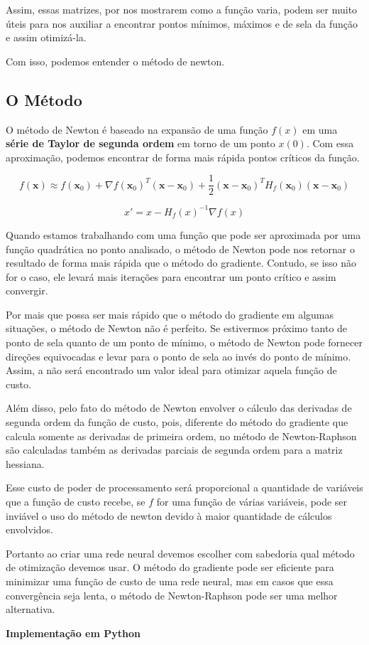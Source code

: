 Assim, essas matrizes, por nos mostrarem como a função varia, podem ser muito úteis para nos auxiliar a encontrar pontos mínimos, máximos e de sela da função e assim otimizá-la.

Com isso, podemos entender o método de newton.

\subsection{O Método}

O método de Newton é baseado na expansão de uma função $f(x)$ em uma \textbf{série de Taylor de segunda ordem} em torno de um ponto $x(0)$. Com essa aproximação, podemos encontrar de forma mais rápida pontos críticos da função.

    \begin{equation}
         f(\mathbf{x}) \approx f(\mathbf{x}_0) + \nabla f(\mathbf{x}_0)^T (\mathbf{x} - \mathbf{x}_0) + \frac{1}{2} (\mathbf{x} - \mathbf{x}_0)^T H_f(\mathbf{x}_0) (\mathbf{x} - \mathbf{x}_0)
    \end{equation}

    \begin{equation}
         x' = x - H_f(x)^{-1} \nabla f(x)
    \end{equation}

Quando estamos trabalhando com uma função que pode ser aproximada por uma função quadrática no ponto analisado, o método de Newton pode nos retornar o resultado de forma mais rápida que o método do gradiente. Contudo, se isso não for o caso, ele levará mais iterações para encontrar um ponto crítico e assim convergir.

Por mais que possa ser mais rápido que o método do gradiente em algumas situações, o método de Newton não é perfeito. Se estivermos próximo tanto de ponto de sela quanto de um ponto de mínimo, o método de Newton pode fornecer direções equivocadas e levar para o ponto de sela ao invés do ponto de mínimo. Assim, a não será encontrado um valor ideal para otimizar aquela função de custo.

Além disso, pelo fato do método de Newton envolver o cálculo das derivadas de segunda ordem da função de custo, pois, diferente do método do gradiente que calcula somente as derivadas de primeira ordem, no método de Newton-Raphson são calculadas também as derivadas parciais de segunda ordem para a matriz hessiana.

 Esse custo de poder de processamento será proporcional a quantidade de variáveis que a função de custo recebe, se $f$ for uma função de várias variáveis, pode ser inviável o uso do método de newton devido à maior quantidade de cálculos envolvidos.

Portanto ao criar uma rede neural devemos escolher com sabedoria qual método de otimização devemos usar. O método do gradiente pode ser eficiente para minimizar uma função de custo de uma rede neural, mas em casos que essa convergência seja lenta, o método de Newton-Raphson pode ser uma melhor alternativa.

\textbf{Implementação em Python}

